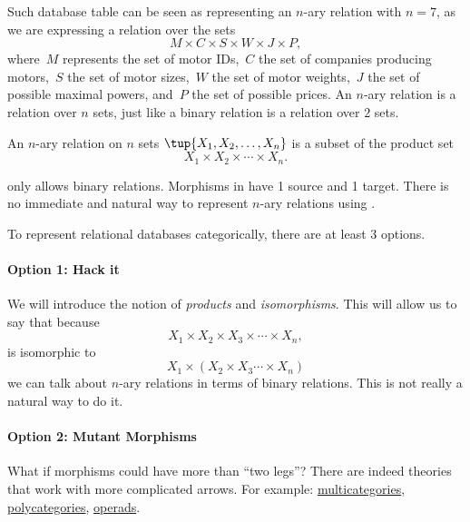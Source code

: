 Such database table can be seen as representing an $n$-ary relation with $n = 7$, as we are expressing a relation
over the sets
\begin{equation*}
    M\times C\times S\times W\times J\times P,
\end{equation*}
where~$M$ represents the set of motor IDs,~$C$ the set of companies producing motors,~$S$ the set of motor sizes,~$W$ the set of motor weights,~$J$ the set of possible maximal powers, and~$P$ the set of possible prices. An $n$-ary relation is a relation over $n$ sets, just like a binary relation is a
relation over $2$ sets.
\begin{definition}\label{def:n-ary-relation}
    An $n$-ary relation on $n$ sets $\tup{X_1, X_2, \dots, X_n}$ is a
    subset of the product set
    \begin{equation*}
        X_1 \times X_2 \times \cdots \times X_n.
    \end{equation*}
\end{definition}

\Rel only allows binary relations. Morphisms in \Rel have 1 source and 1 target. There is no immediate and natural way to represent $n$-ary relations using \Rel.

To represent relational databases categorically, there are at least 3 options.

\paragraph{Option 1: Hack it}
We will introduce the notion of \emph{products} and \emph{isomorphisms}.
This will allow us to say that because
\begin{equation*}
    X_1 \times X_2 \times X_3 \times \cdots \times X_n,
\end{equation*}
is isomorphic to
\begin{equation*}
    X_1 \times ( X_2 \times X_3 \cdots \times X_n)
\end{equation*}
we can talk about $n$-ary relations in terms of binary relations.
This is not really a natural way to do it.

\paragraph{Option 2: Mutant Morphisms}
What if morphisms could have more than ``two legs''? There
are indeed theories that work with more complicated arrows.
For example: \href{https://ncatlab.org/nlab/show/multicategory}{multicategories}, \href{https://ncatlab.org/nlab/show/polycategory}{polycategories}, \href{https://ncatlab.org/nlab/show/operad}{operads}.

